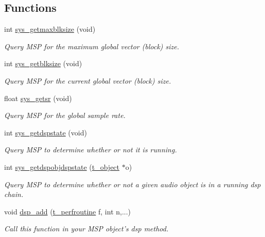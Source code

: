 \subsection*{Functions}
\begin{DoxyCompactItemize}
\item 
int \hyperlink{group__msp_ga8c499862db0fcf07692989aae3d84c9e}{sys\_\-getmaxblksize} (void)
\begin{DoxyCompactList}\small\item\em Query MSP for the maximum global vector (block) size. \item\end{DoxyCompactList}\item 
int \hyperlink{group__msp_ga1d6745373b742617d281901bb063175d}{sys\_\-getblksize} (void)
\begin{DoxyCompactList}\small\item\em Query MSP for the current global vector (block) size. \item\end{DoxyCompactList}\item 
float \hyperlink{group__msp_ga9d492cbb6af86eaf0afb264e886072e5}{sys\_\-getsr} (void)
\begin{DoxyCompactList}\small\item\em Query MSP for the global sample rate. \item\end{DoxyCompactList}\item 
int \hyperlink{group__msp_ga5705fd255a1bfcf9988db8945a1a4284}{sys\_\-getdspstate} (void)
\begin{DoxyCompactList}\small\item\em Query MSP to determine whether or not it is running. \item\end{DoxyCompactList}\item 
int \hyperlink{group__msp_gac949528775cd2346a95c4f89b91567d6}{sys\_\-getdspobjdspstate} (\hyperlink{structt__object}{t\_\-object} $\ast$o)
\begin{DoxyCompactList}\small\item\em Query MSP to determine whether or not a given audio object is in a running dsp chain. \item\end{DoxyCompactList}\item 
void \hyperlink{group__msp_gae9a75fa230b1db6d8316405d4a6065cc}{dsp\_\-add} (\hyperlink{group__msp_gad1bc58df327774373ee9e10ad9026564}{t\_\-perfroutine} f, int n,...)
\begin{DoxyCompactList}\small\item\em Call this function in your MSP object's dsp method. \item\end{DoxyCompactList}\item 

\end{DoxyCompactItemize}
